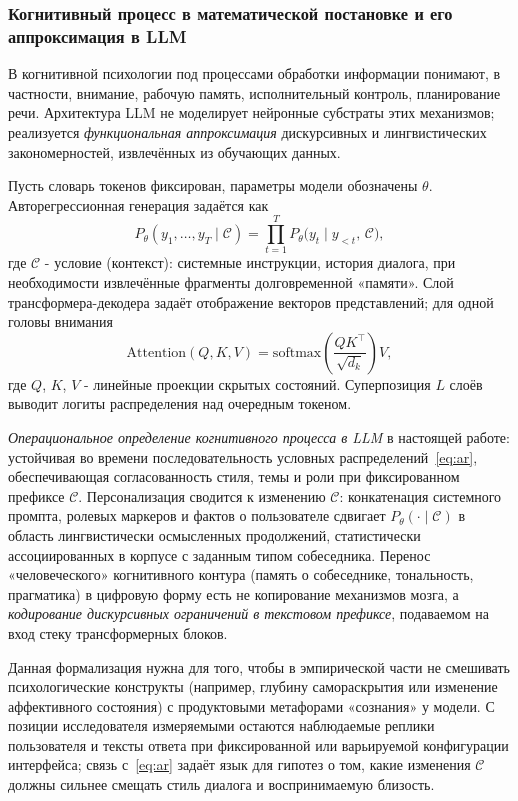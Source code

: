 \documentclass[areasetadvanced]{scrartcl}
\begin{document}
\subsubsection{Когнитивный процесс в математической постановке и его аппроксимация в LLM}

В когнитивной психологии под процессами обработки информации понимают, в частности, внимание, рабочую память, исполнительный контроль, планирование речи. Архитектура LLM не моделирует нейронные субстраты этих механизмов; реализуется \emph{функциональная аппроксимация} дискурсивных и лингвистических закономерностей, извлечённых из обучающих данных.

Пусть словарь токенов фиксирован, параметры модели обозначены $\theta$. Авторегрессионная генерация задаётся как
\begin{equation}
P_\theta(y_1,\ldots,y_T \mid \mathcal{C}) = \prod_{t=1}^{T} P_\theta\bigl(y_t \mid y_{<t},\, \mathcal{C}\bigr),
\label{eq:ar}
\end{equation}
где $\mathcal{C}$ - условие (контекст): системные инструкции, история диалога, при необходимости извлечённые фрагменты долговременной «памяти». Слой трансформера-декодера задаёт отображение векторов представлений; для одной головы внимания
\begin{equation}
\mathrm{Attention}(Q,K,V) = \mathrm{softmax}\left(\frac{QK^\top}{\sqrt{d_k}}\right)V,
\label{eq:attn}
\end{equation}
где $Q$, $K$, $V$ - линейные проекции скрытых состояний. Суперпозиция $L$ слоёв выводит логиты распределения над очередным токеном.

\emph{Операциональное определение когнитивного процесса в LLM} в настоящей работе: устойчивая во времени последовательность условных распределений~\eqref{eq:ar}, обеспечивающая согласованность стиля, темы и роли при фиксированном префиксе $\mathcal{C}$. Персонализация сводится к изменению $\mathcal{C}$: конкатенация системного промпта, ролевых маркеров и фактов о пользователе сдвигает $P_\theta(\cdot \mid \mathcal{C})$ в область лингвистически осмысленных продолжений, статистически ассоциированных в корпусе с заданным типом собеседника. Перенос «человеческого» когнитивного контура (память о собеседнике, тональность, прагматика) в цифровую форму есть не копирование механизмов мозга, а \emph{кодирование дискурсивных ограничений в текстовом префиксе}, подаваемом на вход стеку трансформерных блоков.

Данная формализация нужна для того, чтобы в эмпирической части не смешивать психологические конструкты (например, глубину самораскрытия или изменение аффективного состояния) с продуктовыми метафорами «сознания» у модели. С позиции исследователя измеряемыми остаются наблюдаемые реплики пользователя и тексты ответа при фиксированной или варьируемой конфигурации интерфейса; связь с~\eqref{eq:ar} задаёт язык для гипотез о том, какие изменения $\mathcal{C}$ должны сильнее смещать стиль диалога и воспринимаемую близость.
\end{document}
